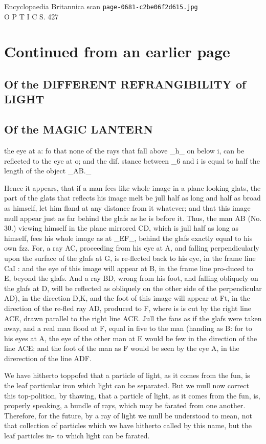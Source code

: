 \documentclass{article}
\begin{document}
\begin{center}
{\Large Encyclopaedia Britannica scan \texttt{page-0681-c2be06f2d615.jpg}}\\[0.5em]
O P T I C S. 427
\end{center}
\section*{Continued from an earlier page}
\subsection*{Of the DIFFERENT REFRANGIBILITY of LIGHT}
\subsection*{Of the MAGIC LANTERN}
the eye at a: fo that none of the rays that fall above \_h\_ on below i, can be reflected to the eye at o; and the dif. stance between \_6 and i is equal to half the length of the object \_AB.\_

Hence it appears, that if a man fees like whole image in a plane looking glats, the part of the glats that reflects his image melt be jull half as long and half as broad as himself, let him fland at any distance from it whatever; and that this image mull appear just as far behind the glafs as he is before it. Thus, the man AB (No. 30.) viewing himself in the plane mirrored CD, which is jull half as long as himself, fees his whole image as at \_EF\_, behind the glafs exactly equal to his own fzz. For, a ray AC, proceeding from his eye at A, and falling perpendicularly upon the surface of the glafs at G, is re-flected back to his eye, in the frame line CaI : and the eye of this image will appear at B, in the frame line pro-duced to E, beyond the glafs. And a ray BD, wrong from his foot, and falling obliquely on the glafs at D, will be reflected as obliquely on the other side of the perpendicular AD), in the direction D,K, and the foot of this image will appear at Ft, in the direction of the re-fled ray AD, produced to F, where is is cut by the right line ACE, drawn parallel to the right line ACE. Jull the fans as if the glafs were taken away, and a real man flood at F, equal in five to the man (handing as B: for to his eyes at A, the eye of the other man at E would be few in the direction of the line ACE; and the foot of the man as F would be seen by the eye A, in the direrection of the line ADF.

We have hitherto toppofed that a particle of light, as it comes from the fun, is the leaf particular iron which light can be separated. But we mull now correct this top-polition, by thawing, that a particle of light, as it comes from the fun, is, properly speaking, a bundle of rays, which may be farated from one another. Therefore, for the future, by a ray of light we mull be understood to mean, not that collection of particles which we have hitherto called by this name, but the leaf particles in- to which light can be farated.
\end{document}
